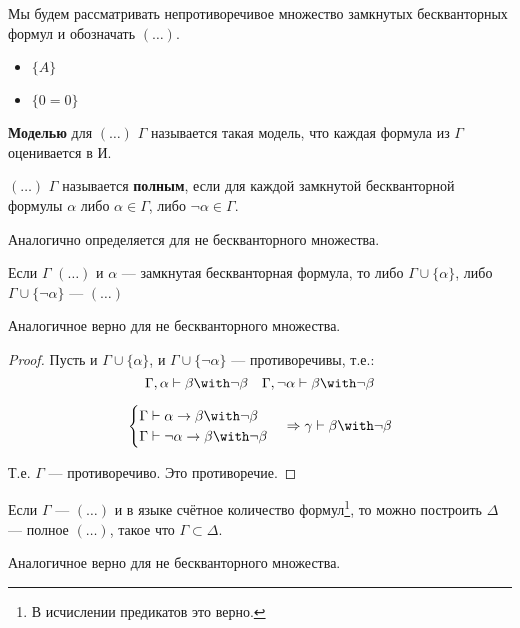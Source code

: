 Мы будем рассматривать непротиворечивое множество замкнутых бескванторных формул и обозначать \((\ldots)\).
\begin{example}\itemfix
    \begin{itemize}
        \item \(\{A\}\)
        \item \(\{0 = 0\}\)
    \end{itemize}
\end{example}

\begin{definition}
    \textbf{Моделью} для \((\ldots)\) \(\Gamma\) называется такая модель, что каждая формула из \(\Gamma\) оценивается в \(\text{И}\).
\end{definition}

\begin{definition}
    \((\ldots)\) \(\Gamma\) называется \textbf{полным}, если для каждой замкнутой бескванторной формулы \(\alpha\) либо \(\alpha \in \Gamma\), либо \(\neg \alpha \in \Gamma\).

    Аналогично определяется для не бескванторного множества.
\end{definition}

\begin{theorem}
    Если \(\Gamma\) \((\ldots)\) и \(\alpha\) --- замкнутая бескванторная формула, то либо \(\Gamma \cup \{\alpha\} \), либо \(\Gamma \cup \{\neg \alpha\}\) --- \((\ldots)\)

    Аналогичное верно для не бескванторного множества.
\end{theorem}
\begin{proof}
    Пусть и \(\Gamma \cup \{\alpha\} \), и \(\Gamma \cup \{\neg \alpha\} \) --- противоречивы, т.е.:
    \[\Gamma, \alpha \vdash \beta \with \neg \beta \quad \Gamma, \neg \alpha \vdash \beta \with \neg \beta\]

    \[\begin{cases} \Gamma \vdash \alpha \to \beta \with \neg \beta \\ \Gamma \vdash \neg \alpha \to \beta \with \neg \beta \end{cases} \Rightarrow \gamma \vdash \beta \with \neg \beta \]

    Т.е. \(\Gamma\) --- противоречиво. Это противоречие.
\end{proof}

\begin{theorem}
    Если \(\Gamma\) --- \((\ldots)\) и в языке счётное количество формул\footnote{В исчислении предикатов это верно.}, то можно построить \(\Delta\) --- полное \((\ldots)\), такое что \(\Gamma \subset \Delta\).

    Аналогичное верно для не бескванторного множества.
\end{theorem}

